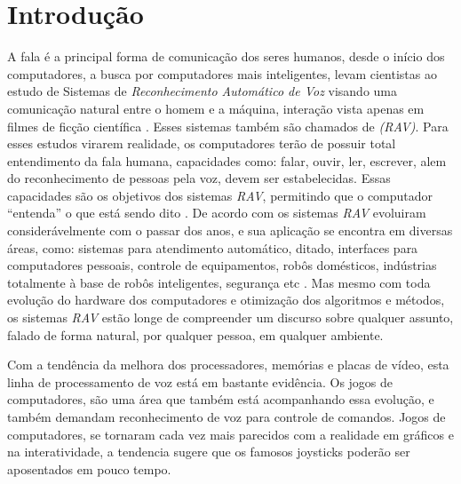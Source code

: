 \chapter{Introdução}

A fala é a principal forma de comunicação dos seres humanos, desde o início dos computadores, a busca por computadores mais inteligentes, levam cientistas ao estudo de Sistemas de \textit {Reconhecimento Automático de Voz} visando uma comunicação natural entre o homem e a máquina, interação vista apenas em filmes de ficção científica \cite{RavPtBrCarlos}. Esses sistemas também são chamados de \textit{(RAV)}. 
Para esses estudos virarem realidade, os computadores terão de possuir total entendimento da fala humana, capacidades como: falar, ouvir, ler, escrever, alem do reconhecimento de pessoas pela voz, devem ser estabelecidas. Essas capacidades são os objetivos dos sistemas \textit{RAV}, permitindo que o computador “entenda” o que está sendo dito \cite{RavCorporaCarlos}.
De acordo com  os sistemas \textit{RAV} evoluiram considerávelmente com o passar dos anos, e sua aplicação se encontra em diversas áreas, como: sistemas para atendimento automático, ditado, interfaces para computadores pessoais, controle de equipamentos, robôs domésticos, indústrias totalmente à base de robôs inteligentes, segurança etc \cite{RavPtBrCarlos}. Mas mesmo com toda evolução do hardware dos computadores e otimização dos algoritmos e métodos, os sistemas \textit{RAV} estão longe de compreender um discurso sobre qualquer assunto, falado de forma natural, por qualquer pessoa, em qualquer ambiente. 

Com a tendência da melhora dos processadores, memórias e placas de vídeo, esta linha de processamento de voz está em bastante evidência. Os jogos de computadores, são uma área que também está acompanhando essa evolução, e também demandam reconhecimento de voz para controle de comandos. Jogos de computadores, se tornaram cada vez mais parecidos com a realidade em gráficos e na interatividade, a tendencia sugere que os famosos joysticks poderão ser aposentados em pouco tempo.

